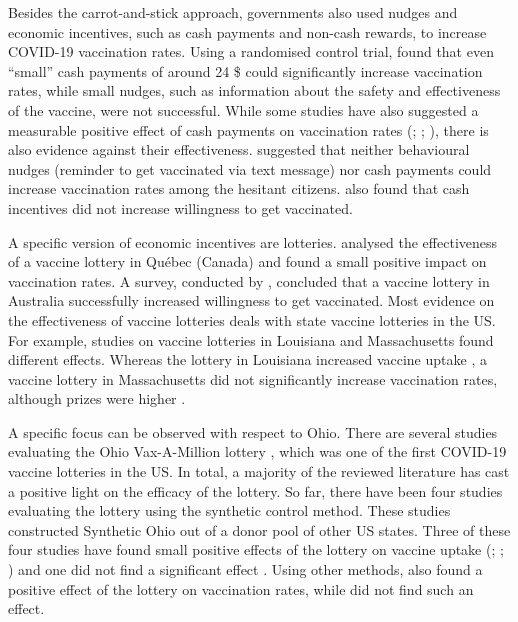 \documentclass{scrbook}
\begin{document}
Besides the carrot-and-stick approach, governments also used nudges and
economic incentives, such as cash payments and non-cash rewards, to
increase COVID-19 vaccination rates. Using a randomised control trial,
\textcite{campos-mercade_monetary_2021} found that even ``small'' cash
payments of around 24 \$ could significantly increase vaccination rates,
while small nudges, such as information about the safety and
effectiveness of the vaccine, were not successful. While some studies
have also suggested a measurable positive effect of cash payments on
vaccination rates (\cite{wong_guaranteed_2022};
\cite{kluver_incentives_2021}; \cite{kim_vaccination_2021-1}), there is
also evidence against their effectiveness. \textcite{jacobson_can_2022}
suggested that neither behavioural nudges (reminder to get vaccinated
via text message) nor cash payments could increase vaccination rates
among the hesitant citizens. \textcite{sprengholz_money_2021} also found
that cash incentives did not increase willingness to get vaccinated.

A specific version of economic incentives are lotteries.
\textcite{dube_exploring_2022} analysed the effectiveness of a vaccine
lottery in Québec (Canada) and found a small positive impact on
vaccination rates. A survey, conducted by
\textcite{jun_association_2022}, concluded that a vaccine lottery in
Australia successfully increased willingness to get vaccinated. Most
evidence on the effectiveness of vaccine lotteries deals with state
vaccine lotteries in the US. For example, studies on vaccine lotteries
in Louisiana and Massachusetts found different effects. Whereas the
lottery in Louisiana increased vaccine uptake
\parencite{wang_moving_2023}, a vaccine lottery in Massachusetts did not
significantly increase vaccination rates, although prizes were higher
\parencite{kim_did_2023}.

A specific focus can be observed with respect to Ohio. There are several
studies evaluating the Ohio Vax-A-Million lottery
\parencite{ohio_department_of_health_ohio_2021}, which was one of the
first COVID-19 vaccine lotteries in the US. In total, a majority of the
reviewed literature has cast a positive light on the efficacy of the
lottery. So far, there have been four studies evaluating the lottery
using the synthetic control method. These studies constructed Synthetic
Ohio out of a donor pool of other US states. Three of these four studies
have found small positive effects of the lottery on vaccine uptake
(\cite{brehm_ohio_2022}; \cite{barber_conditional_2022};
\cite{sehgal_impact_2021}) and one did not find a significant effect
\parencite{lang_did_2022}. Using other methods,
\textcite{mallow_covid-19_2022} also found a positive effect of the
lottery on vaccination rates, while \textcite{walkey_lottery-based_2021}
did not find such an effect.
\end{document}
